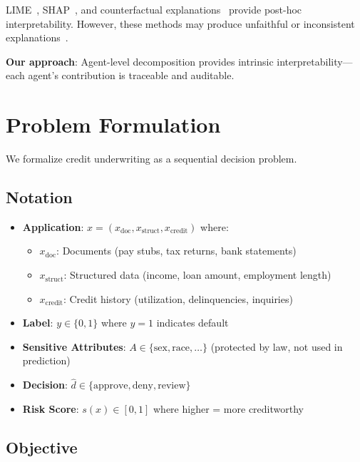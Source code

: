 \documentclass[11pt]{article}
\begin{document}
LIME~\cite{ribeiro2016should}, SHAP~\cite{lundberg2017unified}, and counterfactual explanations~\cite{wachter2017counterfactual} provide post-hoc interpretability. However, these methods may produce unfaithful or inconsistent explanations~\cite{rudin2019stop}.

\textbf{Our approach}: Agent-level decomposition provides intrinsic interpretability---each agent's contribution is traceable and auditable.

\section{Problem Formulation}

We formalize credit underwriting as a sequential decision problem.

\subsection{Notation}

\begin{itemize}
    \item \textbf{Application}: $x = (x_{\text{doc}}, x_{\text{struct}}, x_{\text{credit}})$ where:
    \begin{itemize}
        \item $x_{\text{doc}}$: Documents (pay stubs, tax returns, bank statements)
        \item $x_{\text{struct}}$: Structured data (income, loan amount, employment length)
        \item $x_{\text{credit}}$: Credit history (utilization, delinquencies, inquiries)
    \end{itemize}
    
    \item \textbf{Label}: $y \in \{0, 1\}$ where $y=1$ indicates default
    
    \item \textbf{Sensitive Attributes}: $A \in \{\text{sex}, \text{race}, \ldots\}$ (protected by law, not used in prediction)
    
    \item \textbf{Decision}: $\hat{d} \in \{\text{approve}, \text{deny}, \text{review}\}$
    
    \item \textbf{Risk Score}: $s(x) \in [0, 1]$ where higher = more creditworthy
\end{itemize}

\subsection{Objective}
\end{document}
